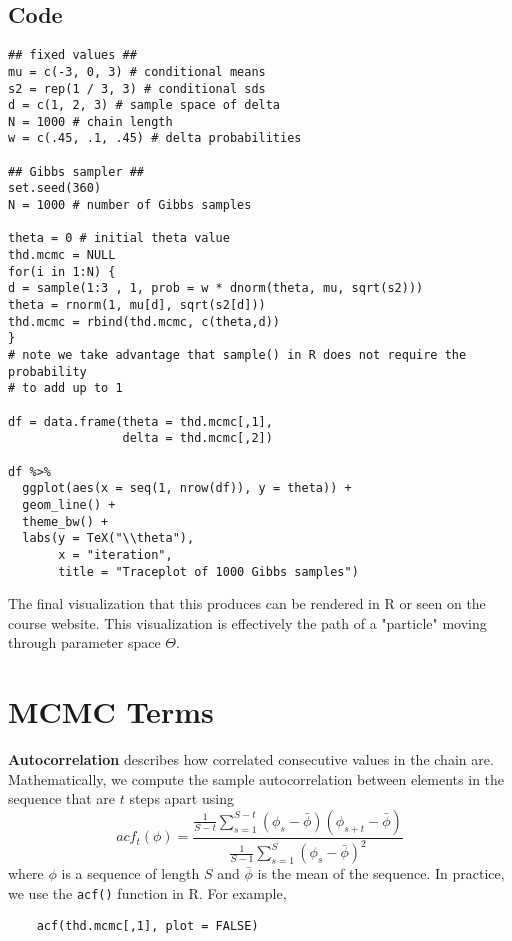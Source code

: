 \documentclass[titlepage, 12pt, leqno]{article}
\begin{document}
\subsection{Code}
\begin{verbatim}
## fixed values ## 
mu = c(-3, 0, 3) # conditional means
s2 = rep(1 / 3, 3) # conditional sds
d = c(1, 2, 3) # sample space of delta
N = 1000 # chain length
w = c(.45, .1, .45) # delta probabilities

## Gibbs sampler ##
set.seed(360)
N = 1000 # number of Gibbs samples

theta = 0 # initial theta value
thd.mcmc = NULL
for(i in 1:N) {
d = sample(1:3 , 1, prob = w * dnorm(theta, mu, sqrt(s2))) 
theta = rnorm(1, mu[d], sqrt(s2[d]))
thd.mcmc = rbind(thd.mcmc, c(theta,d))
}
# note we take advantage that sample() in R does not require the probability
# to add up to 1

df = data.frame(theta = thd.mcmc[,1],
                delta = thd.mcmc[,2])

df %>%
  ggplot(aes(x = seq(1, nrow(df)), y = theta)) +
  geom_line() +
  theme_bw() +
  labs(y = TeX("\\theta"),
       x = "iteration",
       title = "Traceplot of 1000 Gibbs samples")
\end{verbatim}

The final visualization that this produces can be rendered in R or seen on the
course website. This visualization is effectively the path of a "particle"
moving through parameter space $\Theta$.

\pagebreak
\section{MCMC Terms}
\begin{definition}
    \textbf{Autocorrelation} describes how correlated consecutive values in the
    chain are. Mathematically, we compute the sample autocorrelation between
    elements in the sequence that are $t$ steps apart using
    \[
    acf_{t}(\phi) = \frac{\frac{1}{S-t}\sum_{s=1}^{S-t}(\phi_{s}-\bar \phi)
    (\phi_{s+t}-\bar \phi)}{\frac{1}{S-1}\sum_{s=1}^{S}(\phi_{s}-\bar \phi)^{2}}
    \]
    where $\phi$ is a sequence of length $S$ and $\bar \phi$ is the mean of the
    sequence. In practice, we use the \texttt{acf()}  function in R. For 
    example,

    \begin{verbatim}
    acf(thd.mcmc[,1], plot = FALSE)
    \end{verbatim}
\end{definition}
\end{document}
